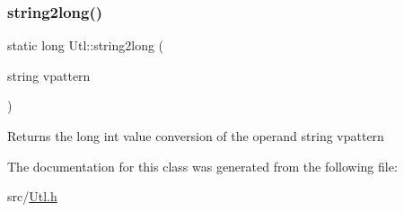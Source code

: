 \subsubsection{\texorpdfstring{string2long()}{string2long()}}
{\footnotesize\ttfamily static long Utl\+::string2long (\begin{DoxyParamCaption}\item[{string}]{vpattern }\end{DoxyParamCaption})\hspace{0.3cm}{\ttfamily [static]}}

\begin{DoxyReturn}{Returns}
the long int value conversion of the operand string vpattern 
\end{DoxyReturn}


The documentation for this class was generated from the following file\+:\begin{DoxyCompactItemize}
\item 
src/\hyperlink{Utl_8h}{Utl.\+h}\end{DoxyCompactItemize}

